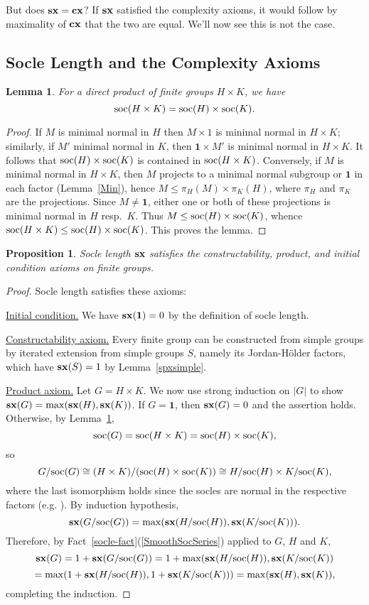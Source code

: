 \documentclass[a4paper,11pt]{amsart}
\newtheorem{lemma}[theorem]{Lemma}
\newtheorem{proposition}[theorem]{Proposition}
\theoremstyle{definition}
\newcommand{\cx}{\mbox{\bf cx}}
\newcommand{\sx}{{\bf sx}}
\newcommand{\soc}{\mbox{\rm soc}}
\newcommand{\1}{{\mathbf 1}}
\begin{document}
\noindent But does $\sx = \cx$?   If $\sx$ satisfied the complexity axioms, it would follow by maximality of $\cx$ that the two are equal.
We'll now see this is not the case.

\subsection{Socle Length and the Complexity Axioms}

\begin{lemma}\label{SocOfProd}
For a direct product of finite groups $H\times K$, we have $$\soc(H\times K)= \soc(H) \times \soc(K).$$
\end{lemma} 
\begin{proof}
If $M$ is minimal normal in $H$ then $M\times 1$ is minimal normal in $H\times K$; similarly, if $M'$ minimal normal in $K$, then $\1\times M'$ is minimal normal in $H\times K$. It follows that $\soc(H) \times \soc(K)$ is contained in $\soc(H\times K)$. Conversely, if $M$ is minimal normal in $H\times K$, then $M$ projects to a minimal normal subgroup or $\1$ in each factor (Lemma~\ref{Min}), hence $M\leq \pi_H(M)\times \pi_K(H)$, where $\pi_H$ and $\pi_K$ are the projections.  Since $M\neq \1$, either one or both of these projections is minimal normal in $H$ resp.\ $K$.   Thus $M\leq  \soc(H)\times \soc(K)$,  whence $\soc(H\times K)\leq  \soc(H)\times \soc(K)$.   This proves the lemma.
\end{proof}

\begin{proposition}


Socle length $\sx$ satisfies 
the constructability, product, and initial condition axioms on finite groups.
\end{proposition}
\begin{proof}


Socle length satisfies these axioms: 

\underline{Initial condition.} We have $\sx(\1)=0$ by the definition of socle length.

\underline{Constructability axiom.}  Every finite group can be constructed from simple groups by iterated extension from simple groups $S$, namely its Jordan-Hölder factors,  
which have $\sx(S)=1$ by Lemma~\ref{spxsimple}.

\underline{Product axiom.}  Let $G=H\times K$.   
We now use strong induction on $|G|$ to show $\sx(G)=\max(\sx(H),\sx(K))$. 
If $G=\1$, then $\sx(G)=0$ and the assertion holds.  Otherwise,
by Lemma~\ref{SocOfProd}, $$\soc(G)=\soc(H\times K) =\soc(H)\times \soc(K),$$ 
so $$G/\soc(G)\cong (H \times K)/(\soc(H)\times \soc(K)) \cong H/\soc(H) \times K/\soc(K),$$
where the last isomorphism holds since the socles are normal in the respective factors (e.g. \cite[Theorem 2.30]{Rotman}).
By induction hypothesis, $$\sx(G/\soc(G))=\max(\sx(H/\soc(H)), \sx(K/\soc(K))).$$ Therefore, by Fact~\ref{socle-fact}(\ref{SmoothSocSeries}) applied to $G$, $H$ and $K$, 
$$\sx(G)=1+\sx(G/\soc(G))=1+ \max(\sx(H/\soc(H)), \sx(K/\soc(K)) $$
$$=\max(1+\sx(H/\soc(H)), 1+\sx(K/\soc(K)))=\max(\sx(H), \sx(K)),$$
completing the induction.
 \end{proof}
\end{document}
